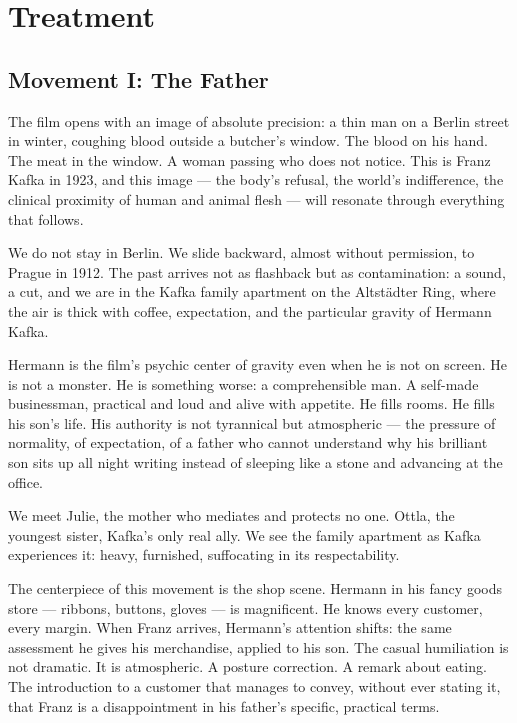 
\section{Treatment}

\subsection{Movement I: The Father}

The film opens with an image of absolute precision: a thin man on a Berlin street in winter, coughing blood outside a butcher's window. The blood on his hand. The meat in the window. A woman passing who does not notice. This is Franz Kafka in 1923, and this image --- the body's refusal, the world's indifference, the clinical proximity of human and animal flesh --- will resonate through everything that follows.

We do not stay in Berlin. We slide backward, almost without permission, to Prague in 1912. The past arrives not as flashback but as contamination: a sound, a cut, and we are in the Kafka family apartment on the Altstädter Ring, where the air is thick with coffee, expectation, and the particular gravity of Hermann Kafka.

Hermann is the film's psychic center of gravity even when he is not on screen. He is not a monster. He is something worse: a comprehensible man. A self-made businessman, practical and loud and alive with appetite. He fills rooms. He fills his son's life. His authority is not tyrannical but atmospheric --- the pressure of normality, of expectation, of a father who cannot understand why his brilliant son sits up all night writing instead of sleeping like a stone and advancing at the office.

We meet Julie, the mother who mediates and protects no one. Ottla, the youngest sister, Kafka's only real ally. We see the family apartment as Kafka experiences it: heavy, furnished, suffocating in its respectability.

The centerpiece of this movement is the shop scene. Hermann in his fancy goods store --- ribbons, buttons, gloves --- is magnificent. He knows every customer, every margin. When Franz arrives, Hermann's attention shifts: the same assessment he gives his merchandise, applied to his son. The casual humiliation is not dramatic. It is atmospheric. A posture correction. A remark about eating. The introduction to a customer that manages to convey, without ever stating it, that Franz is a disappointment in his father's specific, practical terms.

